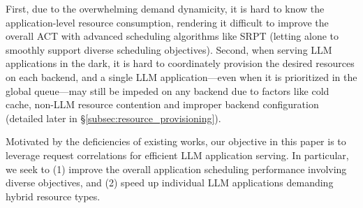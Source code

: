 First, due to the overwhelming demand dynamicity, it is hard to know the application-level resource consumption, rendering it difficult to improve the overall ACT with advanced scheduling algorithms like SRPT (letting alone to smoothly support diverse scheduling objectives).
Second, when serving LLM applications in the dark, it is hard to coordinately provision the desired resources on each backend, and a single LLM application---even when it is prioritized in the global queue---may still be impeded on any backend due to factors like cold cache, non-LLM resource contention and improper backend configuration (detailed later in \S\ref{subsec:resource_provisioning}).



Motivated by the deficiencies of existing works, our objective in this paper is to leverage request correlations for efficient LLM application serving.
In particular, we seek to (1) improve the overall application scheduling performance involving diverse objectives, and (2) speed up individual LLM applications demanding hybrid resource types. 
